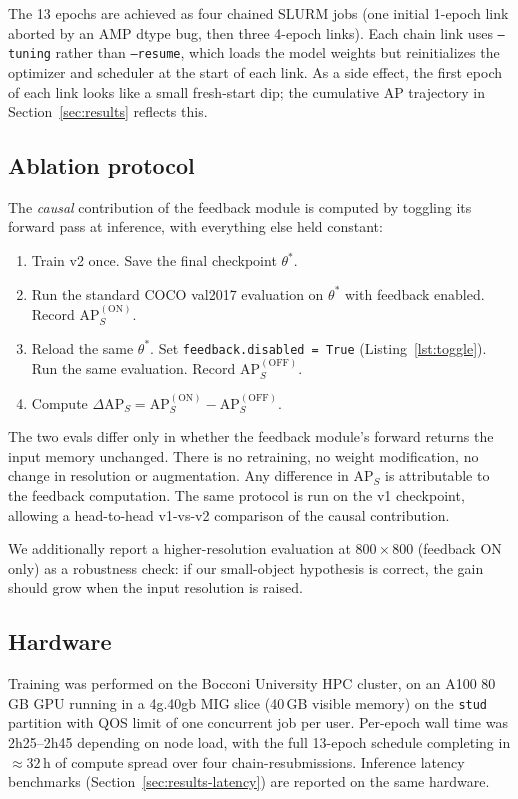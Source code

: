 The 13 epochs are achieved as four chained SLURM jobs (one initial 1-epoch link aborted by an AMP dtype bug, then three 4-epoch links). Each chain link uses \texttt{--tuning} rather than \texttt{--resume}, which loads the model weights but reinitializes the optimizer and scheduler at the start of each link. As a side effect, the first epoch of each link looks like a small fresh-start dip; the cumulative AP trajectory in Section~\ref{sec:results} reflects this.

\subsection{Ablation protocol}
The \emph{causal} contribution of the feedback module is computed by toggling its forward pass at inference, with everything else held constant:
\begin{enumerate}
    \item Train v2 once. Save the final checkpoint $\theta^*$.
    \item Run the standard COCO val2017 evaluation on $\theta^*$ with feedback enabled. Record $\mathrm{AP}_S^{(\text{ON})}$.
    \item Reload the same $\theta^*$. Set \texttt{feedback.disabled = True} (Listing~\ref{lst:toggle}). Run the same evaluation. Record $\mathrm{AP}_S^{(\text{OFF})}$.
    \item Compute $\Delta\mathrm{AP}_S = \mathrm{AP}_S^{(\text{ON})} - \mathrm{AP}_S^{(\text{OFF})}$.
\end{enumerate}
The two evals differ only in whether the feedback module's forward returns the input memory unchanged. There is no retraining, no weight modification, no change in resolution or augmentation. Any difference in $\mathrm{AP}_S$ is attributable to the feedback computation. The same protocol is run on the v1 checkpoint, allowing a head-to-head v1-vs-v2 comparison of the causal contribution.

We additionally report a higher-resolution evaluation at $800\!\times\!800$ (feedback ON only) as a robustness check: if our small-object hypothesis is correct, the gain should grow when the input resolution is raised.

\subsection{Hardware}
Training was performed on the Bocconi University HPC cluster, on an A100 80\,GB GPU running in a 4g.40gb MIG slice (40\,GB visible memory) on the \texttt{stud} partition with QOS limit of one concurrent job per user. Per-epoch wall time was 2h25--2h45 depending on node load, with the full 13-epoch schedule completing in ${\approx}32$\,h of compute spread over four chain-resubmissions. Inference latency benchmarks (Section~\ref{sec:results-latency}) are reported on the same hardware.
